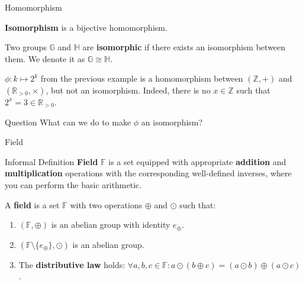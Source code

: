 \documentclass{beamer}
\begin{document}
  \begin{frame}{Homomorphism}
    \begin{definition}
      \textbf{Isomorphism} is a bijective homomorphism.\pause
    \end{definition}

    \begin{definition}
      Two groups $\mathbb{G}$ and $\mathbb{H}$ are \textbf{isomorphic} if there exists an isomorphism between them. We denote it as $\mathbb{G} \cong \mathbb{H}$.\pause
    \end{definition}

    \begin{example}
     $\phi: k \mapsto 2^k$ from the previous example is a homomorphism between $(\mathbb{Z},+)$ and $(\mathbb{R}_{>0},\times)$, but not an isomorphism. Indeed, there is no $x \in \mathbb{Z}$ such that $2^x = 3 \in \mathbb{R}_{>0}$.\pause
    \end{example}

    \begin{alertblock}{Question}
      What can we do to make $\phi$ an isomorphism?
     \end{alertblock}
  \end{frame}

  \begin{frame}{Field}
    \begin{block}{Informal Definition}
        \textbf{Field} $\mathbb{F}$ is a set equipped with appropriate \textbf{addition} and \textbf{multiplication} operations with the corresponding well-defined inverses, where you can perform the basic arithmetic.\pause
    \end{block}
    
      \begin{definition}
        A \textbf{field} is a set $\mathbb{F}$ with two operations $\oplus$ and $\odot$ such that:
        \begin{enumerate}
            \item $(\mathbb{F}, \oplus)$ is an abelian group with identity $e_{\oplus}$.
            \item $(\mathbb{F} \setminus \{e_{\oplus}\}, \odot)$ is an abelian group.
            \item The \textbf{distributive law} holds: $\forall a,b,c \in \mathbb{F}: a \odot (b \oplus c) = (a \odot b) \oplus (a \odot c)$.
        \end{enumerate}
      \end{definition}
    \end{frame}
\end{document}
